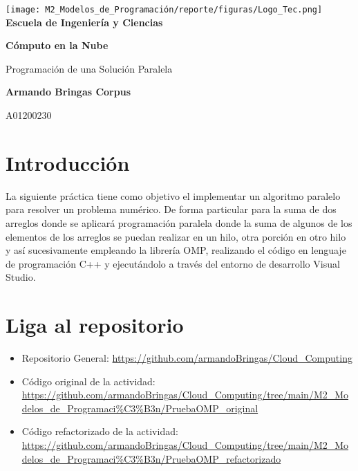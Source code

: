 \documentclass[12pt,a4paper]{article}
\begin{document}
\begin{titlepage}
    \centering
    \texttt{[image: M2\_Modelos\_de\_Programación/reporte/figuras/Logo\_Tec.png]}\\
    \vspace{.5cm}
    \bfseries\large Escuela de Ingeniería y Ciencias
        
    \vspace{5cm}
    \centering
    \textbf{\Huge Cómputo en la Nube}
    \vspace{0.5cm}
        
    {\Large Programación de una Solución Paralela}

    \vspace{5cm}
        
    \textbf{\LARGE Armando Bringas Corpus}
        
    \vspace{0.5cm}
        
    {\large A01200230}
        
    \vfill
        
\end{titlepage}

\section{Introducción}

La siguiente práctica tiene como objetivo el implementar un algoritmo paralelo para resolver un problema numérico. De forma particular para la suma de dos arreglos donde se aplicará programación paralela donde la suma de algunos de los elementos de los arreglos se puedan realizar en un hilo, otra porción en otro hilo y así sucesivamente empleando la librería OMP, realizando el código en lenguaje de programación C++ y ejecutándolo a través del entorno de desarrollo Visual Studio.

\section{Liga al repositorio}

\begin{itemize}
    \item Repositorio General: \url{https://github.com/armandoBringas/Cloud_Computing}
    \item Código original de la actividad: \url{https://github.com/armandoBringas/Cloud_Computing/tree/main/M2_Modelos_de_Programaci%C3%B3n/PruebaOMP_original}
    \item Código refactorizado de la actividad: \url{https://github.com/armandoBringas/Cloud_Computing/tree/main/M2_Modelos_de_Programaci%C3%B3n/PruebaOMP_refactorizado}
\end{itemize}
\end{document}

